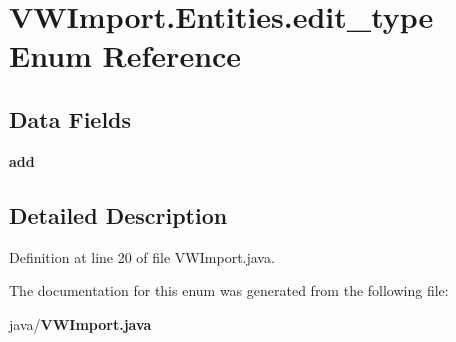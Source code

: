 \section{V\-W\-Import.\-Entities.\-edit\-\_\-type Enum Reference}
\label{enumorg_1_1smallfoot_1_1vw4_1_1VWImport_1_1Entities_1_1edit__type}
\subsection*{Data Fields}
\begin{DoxyCompactItemize}
\item 
{\bfseries add}\label{enumorg_1_1smallfoot_1_1vw4_1_1VWImport_1_1Entities_1_1edit__type_a393e4cd5187ecf30d2db2129a73f3c05}

\end{DoxyCompactItemize}


\subsection{Detailed Description}


Definition at line 20 of file V\-W\-Import.\-java.



The documentation for this enum was generated from the following file\-:\begin{DoxyCompactItemize}
\item 
java/{\bf V\-W\-Import.\-java}\end{DoxyCompactItemize}
